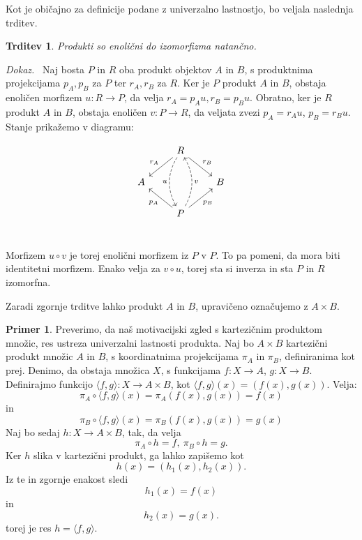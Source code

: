 \documentclass[12pt,a4paper]{book}
\theoremstyle{definition}
\theoremstyle{plain}
\newtheorem{trditev}[definicija]{Trditev}
\newenvironment{dokaz}{\emph{Dokaz.}\ }{\hspace{\fill}{$\Box$}}
\theoremstyle{definition}
\newtheorem{primer}{Primer}[section]
\theoremstyle{remark}
\begin{document}
Kot je običajno za definicije podane z univerzalno lastnostjo, bo veljala naslednja trditev.

\begin{trditev}
Produkti so enolični do izomorfizma natančno.
\end{trditev}
\begin{dokaz}
Naj bosta $P$ in $R$ oba produkt objektov $A$ in $B$, s produktnima projekcijama $p_A, p_B$ za $P$ ter $r_A, r_B$ za $R$. Ker je $P$ produkt $A$ in $B$, obstaja enoličen morfizem $u : R \to P$, da velja $r_A = p_Au, r_B = p_Bu$. Obratno, ker je $R$ produkt $A$ in $B$, obstaja enoličen $v : P \to R$, da veljata zvezi $p_A = r_Au$, $p_B = r_Bu$. Stanje prikažemo v diagramu:

$$\begin{tikzcd}
& R \ar[dd, dashed, bend right, "u"'] \ar[dl, "r_A"'] \ar[dr, "r_B"] & \\
A & & B \\
& P \ar[uu, dashed, bend right, "v"'] \ar[ul, "p_A"] \ar[ur, "p_B"'] & \\
\end{tikzcd}$$

Morfizem $u \circ v $ je torej enolični morfizem iz $P$ v $P$. To pa pomeni, da mora biti identitetni morfizem. Enako velja za $v \circ u$, torej sta si inverza in sta $P$ in $R$ izomorfna.
\end{dokaz}

Zaradi zgornje trditve lahko produkt $A$ in $B$, upravičeno označujemo z $A \times B$.

\begin{primer}
Preverimo, da naš motivacijski zgled s kartezičnim produktom množic, res ustreza univerzalni lastnosti produkta. Naj bo $A \times B$ kartezični produkt množic $A$ in $B$, s koordinatnima projekcijama $\pi_A$ in $\pi_B$, definiranima kot prej. Denimo, da obstaja množica $X$, s funkcijama $f : X \to A$, $g : X \to B$. Definirajmo funkcijo $\langle f,g \rangle : X \to A \times B$, kot $\langle f,g \rangle(x) = (f(x),g(x))$. Velja:
$$ \pi_A \circ \langle f,g \rangle (x) = \pi_A(f(x),g(x)) = f(x) $$
in 
$$ \pi_B \circ \langle f,g \rangle (x) = \pi_B(f(x),g(x)) = g(x) $$
Naj bo sedaj $h : X \to A \times B$, tak, da velja
$$\pi_A \circ h = f, \ \pi_B \circ h = g.$$
Ker $h$ slika v kartezični produkt, ga lahko zapišemo kot
$$h(x) = (h_1(x),h_2(x)).$$
Iz te in zgornje enakost sledi
$$h_1(x) = f(x)$$
in $$h_2(x) = g(x).$$
torej je res $h = \langle f,g \rangle$.
\end{primer}
\end{document}
